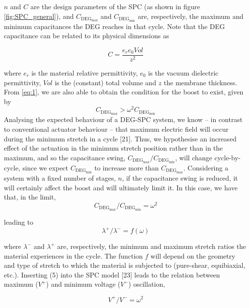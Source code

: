 $n$ and $C$ are the design parameters of the SPC (as shown in figure \ref{fig:SPC_general}), and $C_{\text{DEG}_\text{max}}$ and $C_{\text{DEG}_\text{min}}$ are, respectively, the maximum and minimum capacitances the DEG reaches in that cycle. Note that the DEG capacitance can be related to its physical dimensions as

\begin{equation}
C=\frac{e_r e_0 Vol}{z^2}
\end{equation}

where $e_r$ is the material relative permittivity, $e_0$ is the vacuum dielectric permittivity, $Vol$ is the (constant) total volume and $z$ the membrane thickness.
From \ref{eq:1}, we are also able to obtain the condition for the boost to exist, given by 
\begin{equation}
C_{\text{DEG}_\text{max}}>\omega^2 C_{\text{DEG}_\text{min}}
\end{equation}
Analysing the expected behaviour of a DEG-SPC system, we know – in contrast to conventional actuator behaviour – that maximum electric field will occur during the minimum stretch in a cycle [21]. Thus, we hypothesise an increased effect of the actuation in the minimum stretch position rather than in the maximum, and so the capacitance swing, $C_{\text{DEG}_\text{max}}/C_{\text{DEG}_\text{min}}$, will change cycle-by-cycle, since we expect $C_{\text{DEG}_\text{min}}$ to increase more than $C_{\text{DEG}_\text{max}}$. Considering a system with a fixed number of stages, $n$, if the capacitance swing is reduced, it will certainly affect the boost and will ultimately limit it. In this case, we have that, in the limit,
\begin{equation}
C_{\text{DEG}_\text{max}}/C_{\text{DEG}_\text{min}}= \omega^2
\end{equation}

leading to 
\begin{equation}
\lambda^+/\lambda^- =f(\omega)
\end{equation}

where $\lambda^-$ and $\lambda^+$ are, respectively, the minimum and maximum stretch ratios the material experiences in the cycle. The function $f$ will depend on the geometry and type of stretch to which the material is subjected to (pure-shear, equibiaxial, etc.).
Inserting (5) into the SPC model [23] leads to the relation between maximum ($V^+$) and minimum voltage ($V^-$) oscillation,

\begin{equation}
V^+/V^- = \omega^2
\end{equation}

